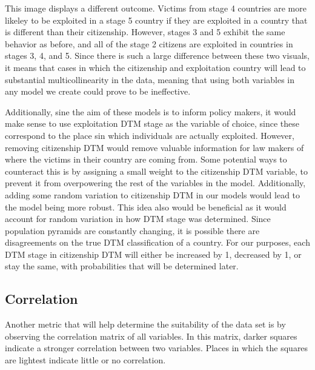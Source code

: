\documentclass{article} %
\begin{document}
This image displays a different outcome. Victims from stage 4 countries are more likeley to be exploited in a stage 5 country if they are exploited in a country that is different than their citizenship. However, stages 3 and 5 exhibit the same behavior as before, and all of the stage 2 citizens are exploited in countries in stages 3, 4, and 5. Since there is such a large difference between these two visuals, it means that cases in which the citizenship and exploitation country will lead to substantial multicollinearity in the data, meaning that using both variables in any model we create could prove to be ineffective. 

Additionally, sine the aim of these models is to inform policy makers, it would make sense to use exploitation DTM stage as the variable of choice, since these correspond to the place sin which individuals are actually exploited. However, removing citizenship DTM would remove valuable information for law makers of where the victims in their country are coming from. Some potential ways to counteract this is by assigning a small weight to the citizenship DTM variable, to prevent it from overpowering the rest of the variables in the model. Additionally, adding some random variation to citizenship DTM in our models would lead to the model being more robust. This idea also would be beneficial as it would account for random variation in how DTM stage was determined. Since population pyramids are constantly changing, it is possible there are disagreements on the true DTM classification of a country. For our purposes, each DTM stage in citizenship DTM will either be increased by 1, decreased by 1, or stay the same, with probabilities that will be determined later.

\subsection{Correlation}

Another metric that will help determine the suitability of the data set is by observing the correlation matrix of all variables. In this matrix, darker squares indicate a stronger correlation between two variables. Places in which the squares are lightest indicate little or no correlation. 
\end{document}
